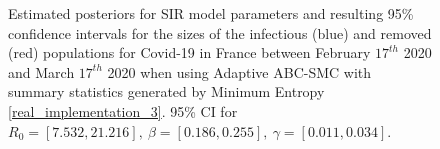 \documentclass[11pt,a4paper]{article}
\theoremstyle{break}
\begin{document}
  \begin{figure}[H]
    \centering
    \caption{Estimated posteriors for SIR model parameters and resulting 95\% confidence intervals for the sizes of the infectious (blue) and removed (red) populations for Covid-19 in France between February $17^{th}$ 2020 and March $17^{th}$ 2020 when using Adaptive ABC-SMC with summary statistics generated by Minimum Entropy \ref{real_implementation_3}. 95\% CI for $R_0=[7.532,21.216],\ \beta=[0.186,0.255],\ \gamma=[0.011,0.034]$.}
    \label{fig_france_me}
  \end{figure}
\end{document}
